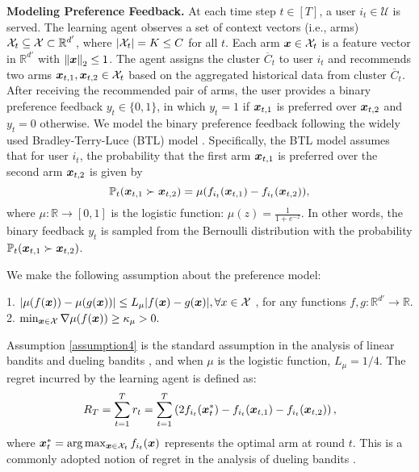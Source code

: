 \textbf{Modeling Preference Feedback.}
At each time step \( t \in [T] \), a user \( i_t \in \mathcal{U} \) is served. The learning agent observes a set of context vectors (i.e., arms) \( \mathcal{X}_t \subseteq \mathcal{X} \subset \mathbb{R}^{d'} \), where \( \left|\mathcal{X}_t\right| = K \leq C \) for all \( t \).
Each arm \( \boldsymbol{x} \in \mathcal{X}_t \) is a feature vector in \( \mathbb{R}^{d'} \) with \( \left\| \boldsymbol{x} \right\|_2 \leq 1 \). The agent assigns the cluster \( \overline{C}_t \) to user \( i_t \) and recommends two arms \( \boldsymbol{x}_{t,1}, \boldsymbol{x}_{t,2} \in \mathcal{X}_t \) based on the aggregated historical data from cluster \( \overline{C}_t \). 
After receiving the recommended pair of arms, the user provides a binary preference feedback \( y_t \in \{0, 1\} \), in which $y_t=1$ if $\boldsymbol{x}_{t,1}$ is preferred over $\boldsymbol{x}_{t,2}$ and $y_t=0$ otherwise.
We model the binary preference feedback following the widely used Bradley-Terry-Luce (BTL) model \cite{AS04_hunter2004mm,Book_luce2005individual}.
Specifically, the BTL model assumes that for user $i_t$,
the probability that the first arm $\boldsymbol{x}_{t,1}$ is preferred over the second arm $\boldsymbol{x}_{t,2}$ is given by
\[
\mathbb{P}_t(\boldsymbol{x}_{t,1} \succ \boldsymbol{x}_{t,2}) = \mu(f_{i_t}(\boldsymbol{x}_{t,1}) - f_{i_t}(\boldsymbol{x}_{t,2})),
\]
where \( \mu: \mathbb{R} \to [0, 1] \) is the logistic function: \( \mu(z) = \frac{1}{1+e^{-z}} \). 
In other words, the binary feedback $y_t$ is sampled from the Bernoulli distribution with the probability $\mathbb{P}_t(\boldsymbol{x}_{t,1} \succ \boldsymbol{x}_{t,2})$.

We make the following assumption about the preference model:
\begin{assumption}
\label{assumption4}
1. $|\mu(f(\boldsymbol{x})) - \mu(g(\boldsymbol{x}))| \le L_\mu|f(\boldsymbol{x}) - g(\boldsymbol{x})|, \forall x\in\mathcal{X}$ , for any functions $f,g: \mathbb R^{d'} \rightarrow \mathbb R$.\\
2. $\min_{\boldsymbol{x} \in \mathcal{X}} \nabla\mu(f(\boldsymbol{x})) \ge \kappa_\mu > 0.$
\end{assumption}
Assumption \ref{assumption4} is the standard assumption in the analysis of linear bandits and dueling bandits \cite{ICML17_li2017provably,ICML22_bengs2022stochastic}, and when $\mu$ is the logistic function, $L_\mu = 1/4$.
The regret incurred by the learning agent is defined as:
\[
R_T = \sum_{t=1}^{T} r_t = \sum_{t=1}^{T} \left( 2 f_{i_t}(\boldsymbol{x}^*_t) - f_{i_t}(\boldsymbol{x}_{t,1}) - f_{i_t}(\boldsymbol{x}_{t,2}) \right),
\]
where \( \boldsymbol{x}^*_t = \arg\max_{\boldsymbol{x} \in \mathcal{X}_t} f_{i_t}(\boldsymbol{x}) \) represents the optimal arm at round \( t \).
This is a commonly adopted notion of regret in the analysis of dueling bandits \cite{ICML22_bengs2022stochastic,ALT22_saha2022efficient}.

